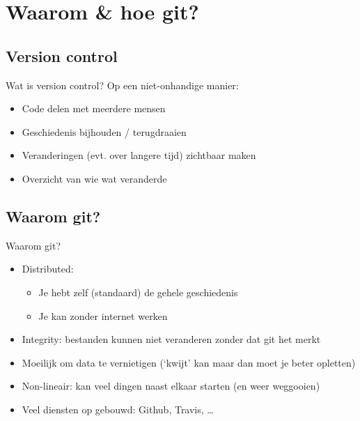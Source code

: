 \section[W\&H?]{Waarom \& hoe git?}

\subsection{Version control}
\begin{frame}{Wat is version control?}
	Op een niet-onhandige manier:
		\begin{itemize}
			\item Code delen met meerdere mensen
			\item Geschiedenis bijhouden / terugdraaien
			\item Veranderingen (evt. over langere tijd) zichtbaar maken
			\item Overzicht van wie wat veranderde
		\end{itemize}
\end{frame}

\subsection{Waarom git?}
\begin{frame}{Waarom git?}
	\begin{itemize}
		\item Distributed:
			\begin{itemize}
				\item Je hebt zelf (standaard) de gehele geschiedenis
				\item Je kan zonder internet werken
			\end{itemize}
		\item Integrity: bestanden kunnen niet veranderen zonder dat git het merkt
		\item Moeilijk om data te vernietigen (`kwijt' kan maar dan moet je beter opletten)
		\item Non-lineair: kan veel dingen naast elkaar starten (en weer weggooien)
		\item Veel diensten op gebouwd: Github, Travis, \ldots
	\end{itemize}
\end{frame}

